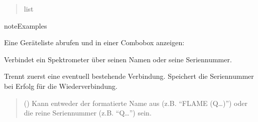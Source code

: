 \documentclass[letterpaper,10pt,english]{sphinxmanual}
\begin{document}
\begin{fulllineitems}
\begin{fulllineitems}
\begin{quote}
\begin{description}
\sphinxAtStartPar
list

\end{description}\end{quote}

\begin{sphinxadmonition}{note}{Examples}

\sphinxAtStartPar
Eine Geräteliste abrufen und in einer Combobox anzeigen:

\begin{sphinxVerbatim}[commandchars=\\\{\}]

      

\end{sphinxVerbatim}
\end{sphinxadmonition}

\end{fulllineitems}


\begin{fulllineitems}
\label{\detokenize{modulab/spectrometer_manager:modules.spectrometer.SpectrometerManager.SpectrometerManager.connect}}
\pysigstartsignatures
\pysiglinewithargsret
{}
{}
{}
\pysigstopsignatures
\sphinxAtStartPar
Verbindet ein Spektrometer über seinen Namen oder seine Seriennummer.

\sphinxAtStartPar
Trennt zuerst eine eventuell bestehende Verbindung.
Speichert die Seriennummer bei Erfolg für die Wiederverbindung.
\begin{quote}\begin{description}
\sphinxAtStartPar
{} () \textendash{} Kann entweder der formatierte Name aus 
(z.B. “FLAME (Q…)”) oder die reine Seriennummer
(z.B. “Q…”) sein.


\end{description}
\end{quote}
\end{fulllineitems}
\end{fulllineitems}
\end{document}

